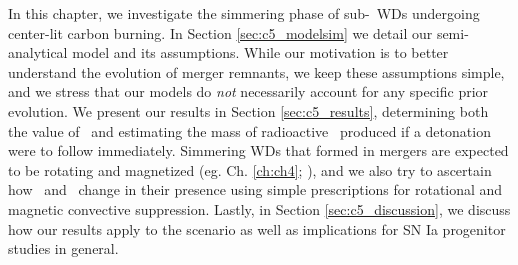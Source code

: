 In this chapter, we investigate the simmering phase of sub-\Mch\ WDs undergoing center-lit carbon burning.  In Section \ref{sec:c5_modelsim} we detail our semi-analytical model and its assumptions.  While our motivation is to better understand the evolution of merger remnants, we keep these assumptions simple, and we stress that our models do \textit{not} necessarily account for any specific prior evolution.  We present our results in Section \ref{sec:c5_results}, determining both the value of \Mcrit\ and estimating the mass of radioactive \Ni\ produced if a detonation were to follow immediately.  Simmering WDs that formed in mergers are expected to be rotating and magnetized (eg. Ch. \ref{ch:ch4}; \citealt{ji+13, wicktf14}), and we also try to ascertain how \Mcrit\ and \MNi\ change in their presence using simple prescriptions for rotational and magnetic convective suppression.  Lastly, in Section \ref{sec:c5_discussion}, we discuss how our results apply to the \citeal{vkercj10} scenario as well as implications for SN Ia progenitor studies in general.
